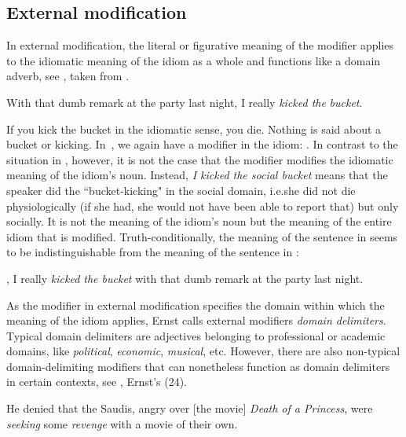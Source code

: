 \documentclass[output=paper]{langsci/langscibook}
\begin{document}
\subsection{External modification} \label{ExtMod}

In external modification, the literal or figurative meaning of the modifier applies to the idiomatic meaning of the idiom as a whole and functions like a domain adverb, see , taken from \cite[51]{ernst81}.

\ea \label{social bucket}
With that dumb remark at the party last night, I really \textit{kicked the} \underline{} \textit{bucket}.
\z

\noindent If you kick the bucket in the idiomatic sense, you die. Nothing is said about a bucket or kicking. \mbox{In }, we again have a modifier in the idiom: \underline{}. In contrast to the situation in , however, it is not the case that the modifier modifies the idiomatic meaning of the idiom's noun. Instead, \textit{I kicked the social bucket} means that the speaker did the ``bucket-kicking" in the social domain, i.e.\@ she did not die physiologically (if she had, she would not have been able to report that) but only socially. It is not the meaning of the idiom's noun but the meaning of the entire idiom that is modified. Truth-conditionally, the meaning of the sentence in  seems to be indistinguishable from the meaning of the sentence in :
\vspace{5pt}

\ea \label{socially ktb}
\underline{}, I really \textit{kicked the bucket} with that dumb remark at the party last night.
\z

\noindent As the modifier in external modification specifies the domain within which the meaning of the idiom applies, Ernst calls external modifiers \textit{domain delimiters}. Typical domain delimiters are adjectives belonging to professional or academic domains, like \textit{political}, \textit{economic}, \textit{musical}, etc. However, there are also non-typical domain-delimiting modifiers that can nonetheless function as domain delimiters in certain contexts, see , Ernst's (24).

\ea \label{celluloid revenge}
He denied that the Saudis, angry over [the movie] \textit{Death of a Princess}, were \textit{seeking} some \underline{} \textit{revenge} with a movie of their own.
\z
\end{document}
